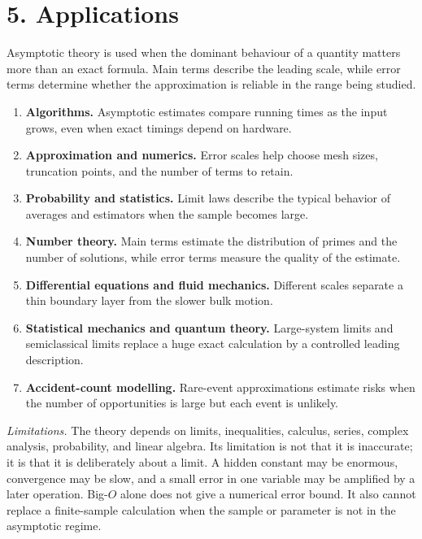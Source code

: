 \section*{5. Applications}
Asymptotic theory is used when the dominant behaviour of a quantity matters more than an exact formula. Main terms describe the leading scale, while error terms determine whether the approximation is reliable in the range being studied.
\begin{enumerate}[leftmargin=*,itemsep=0.35em]
\item \textbf{Algorithms.} Asymptotic estimates compare running times as the input grows, even when exact timings depend on hardware.
\item \textbf{Approximation and numerics.} Error scales help choose mesh sizes, truncation points, and the number of terms to retain.
\item \textbf{Probability and statistics.} Limit laws describe the typical behavior of averages and estimators when the sample becomes large.
\item \textbf{Number theory.} Main terms estimate the distribution of primes and the number of solutions, while error terms measure the quality of the estimate.
\item \textbf{Differential equations and fluid mechanics.} Different scales separate a thin boundary layer from the slower bulk motion.
\item \textbf{Statistical mechanics and quantum theory.} Large-system limits and semiclassical limits replace a huge exact calculation by a controlled leading description.
\item \textbf{Accident-count modelling.} Rare-event approximations estimate risks when the number of opportunities is large but each event is unlikely.
\end{enumerate}
\noindent\emph{Limitations.} The theory depends on limits, inequalities, calculus, series, complex analysis, probability, and linear algebra. Its limitation is not that it is inaccurate; it is that it is deliberately about a limit. A hidden constant may be enormous, convergence may be slow, and a small error in one variable may be amplified by a later operation. Big-$O$ alone does not give a numerical error bound. It also cannot replace a finite-sample calculation when the sample or parameter is not in the asymptotic regime.


